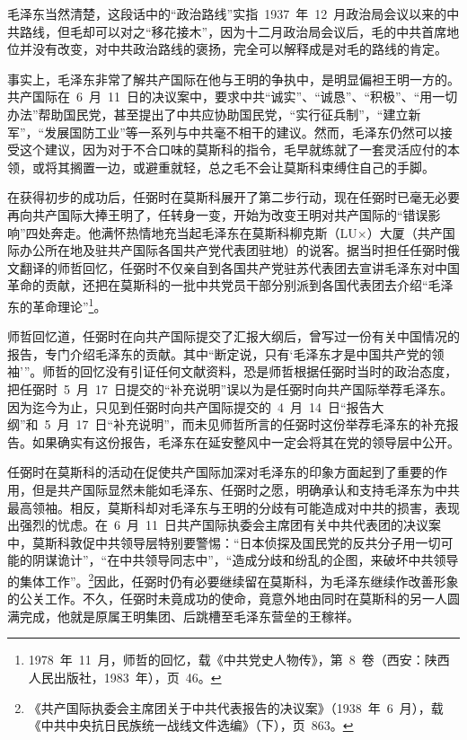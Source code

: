 毛泽东当然清楚，这段话中的“政治路线”实指~1937~年~12~月政治局会议以来的中共路线，但毛却可以对之“移花接木”，因为十二月政治局会议后，毛的中共首席地位并没有改变，对中共政治路线的褒扬，完全可以解释成是对毛的路线的肯定。

事实上，毛泽东非常了解共产国际在他与王明的争执中，是明显偏袒王明一方的。共产国际在~6~月~11~日的决议案中，要求中共“诚实”、“诚恳”、“积极”、“用一切办法”帮助国民党，甚至提出了中共应协助国民党，“实行征兵制”，“建立新军”，“发展国防工业”等一系列与中共毫不相干的建议。然而，毛泽东仍然可以接受这个建议，因为对于不合口味的莫斯科的指令，毛早就练就了一套灵活应付的本领，或将其搁置一边，或避重就轻，总之毛不会让莫斯科束缚住自己的手脚。

在获得初步的成功后，任弼时在莫斯科展开了第二步行动，现在任弼时已毫无必要再向共产国际大捧王明了，任转身一变，开始为改变王明对共产国际的“错误影响”四处奔走。他满怀热情地充当起毛泽东在莫斯科柳克斯（LU×）大厦（共产国际办公所在地及驻共产国际各国共产党代表团驻地）的说客。据当时担任任弼时俄文翻译的师哲回忆，任弼时不仅亲自到各国共产党驻苏代表团去宣讲毛泽东对中国革命的贡献，还把在莫斯科的一批中共党员干部分别派到各国代表团去介绍“毛泽东的革命理论”\footnote{1978~年~11~月，师哲的回忆，载《中共党史人物传》，第~8~卷（西安：陕西人民出版社，1983~年），页~46。}。

师哲回忆道，任弼时在向共产国际提交了汇报大纲后，曾写过一份有关中国情况的报告，专门介绍毛泽东的贡献。其中“断定说，只有‘毛泽东才是中国共产党的领袖’”。师哲的回忆没有引证任何文献资料，恐是师哲根据任弼时当时的政治态度，把任弼时~5~月~17~日提交的“补充说明”误以为是任弼时向共产国际举荐毛泽东。因为迄今为止，只见到任弼时向共产国际提交的~4~月~14~日“报告大纲”和~5~月~17~日“补充说明”，而未见师哲所言的任弼时这份举荐毛泽东的补充报告。如果确实有这份报告，毛泽东在延安整风中一定会将其在党的领导层中公开。

任弼时在莫斯科的活动在促使共产国际加深对毛泽东的印象方面起到了重要的作用，但是共产国际显然未能如毛泽东、任弼时之愿，明确承认和支持毛泽东为中共最高领袖。相反，莫斯科却对毛泽东与王明的分歧有可能造成对中共的损害，表现出强烈的忧虑。在~6~月~11~日共产国际执委会主席团有关中共代表团的决议案中，莫斯科敦促中共领导层特别要警惕：“日本侦探及国民党的反共分子用一切可能的阴谋诡计”，“在中共领导同志中”，“造成分歧和纷乱的企图，来破坏中共领导的集体工作”。\footnote{《共产国际执委会主席团关于中共代表报告的决议案》（1938~年~6~月），载《中共中央抗日民族统一战线文件选编》（下），页~863。}因此，任弼时仍有必要继续留在莫斯科，为毛泽东继续作改善形象的公关工作。不久，任弼时未竟成功的使命，竟意外地由同时在莫斯科的另一人圆满完成，他就是原属王明集团、后跳槽至毛泽东营垒的王稼祥。

